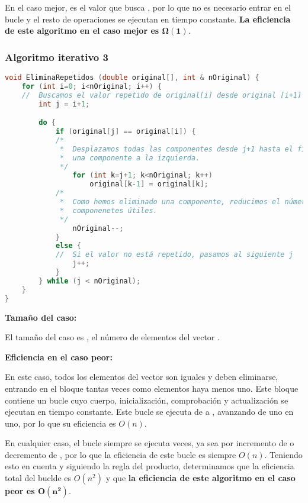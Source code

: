 En el caso mejor,  es el valor que busca , por lo que no es necesario entrar en el bucle y el resto de operaciones se ejecutan en tiempo constante.
\textbf{La eficiencia de este algoritmo en el caso mejor es $\boldsymbol{\Omega(1)}$}.

\pagebreak

\subsubsection{Algoritmo iterativo 3}

\begin{lstlisting}[language=C]
void EliminaRepetidos (double original[], int & nOriginal) {
	for (int i=0; i<nOriginal; i++) {
	//	Buscamos el valor repetido de original[i] desde original [i+1] hasta el final.
		int j = i+1;

		do {
			if (original[j] == original[i]) {
			/*
			 *	Desplazamos todas las componentes desde j+1 hasta el final,
			 *	una componente a la izquierda.
			 */
				for (int k=j+1; k<nOriginal; k++)
					original[k-1] = original[k];
			/*
			 *	Como hemos eliminado una componente, reducimos el número de
			 *	componenetes útiles.
			 */
				nOriginal--;
			}
			else {
			//	Si el valor no está repetido, pasamos al siguiente j
				j++;
			}
		} while (j < nOriginal);
	}
}
\end{lstlisting}

\textbf{Tamaño del caso:}

El tamaño del caso es , el número de elementos del vector .

\textbf{Eficiencia en el caso peor:}

En este caso, todos los elementos del vector son iguales y deben eliminarse, entrando en el bloque  tantas veces como elementos haya menos uno.
Este bloque contiene un bucle  cuyo cuerpo, inicialización, comprobación y actualización se ejecutan en tiempo constante.
Este bucle se ejecuta de  a , avanzando de uno en uno, por lo que su eficiencia es $O(n)$.

En cualquier caso, el bucle  siempre se ejecuta  veces, ya sea por incremento de  o decremento de , por lo que la eficiencia de este bucle es siempre $O(n)$.
Teniendo esto en cuenta y siguiendo la regla del producto, determinamos que la eficiencia total del buclde  es $O(n^2)$ y que \textbf{la eficiencia de este algoritmo en el caso peor es $\boldsymbol{O(n^2)}$}.

